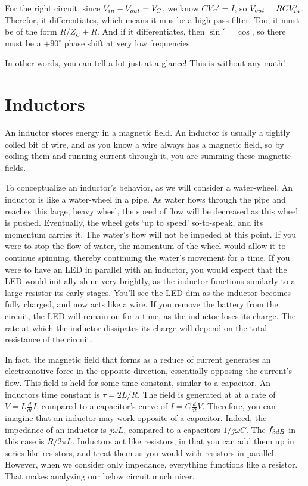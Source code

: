 For the right circuit, since ${V}_{in} - {V}_{out} = V_C$, we know $CV_C' = I$, so ${V}_{out} = RC{V}_{in}'$. Therefor, it differentiates, which means it mus be a high-pass filter. Too, it must be of the form $R/Z_C + R$. And if it differentiates, then $\sin ' = \cos$, so there must be a $+90^{\circ}$ phase shift at very low frequencies.\newline

In other words, you can tell a lot just at a glance! This is without any math!

\section{Inductors}
An inductor stores energy in a magnetic field. An inductor is usually a tightly coiled bit of wire, and as you know a wire always has a magnetic field, so by coiling them and running current through it, you are summing these magnetic fields.\newline

To conceptualize an inductor's behavior, as we will consider a water-wheel. An inductor is like a water-wheel in a pipe. As water flows through the pipe and reaches this large, heavy wheel, the speed of flow will be decreased as this wheel is pushed. Eventually, the wheel gets `up to speed' so-to-speak, and its momentum carries it. The water's flow will not be impeded at this point. If you were to stop the flow of water, the momentum of the wheel would allow it to continue spinning, thereby continuing the water's movement for a time. If you were to have an LED in parallel with an inductor, you would expect that the LED would initially shine very brightly, as the inductor functions similarly to a large resistor its early stages. You'll see the LED dim as the inductor becomes fully charged, and now acts like a wire. If you remove the battery from the circuit, the LED will remain on for a time, as the inductor loses its charge. The rate at which the inductor dissipates its charge will depend on the total resistance of the circuit.\newline

In fact, the magnetic field that forms as a reduce of current generates an electromotive force in the opposite direction, essentially opposing the current's flow. This field is held for some time constant, similar to a capacitor. An inductors time constant is $\tau = 2L/R$. The field is generated at at a rate of $V = L\frac{d}{dt}I$, compared to a capacitor's curve of $I = C\frac{d}{dt}V$. Therefore, you can imagine that an inductor may work opposite of a capacitor. Indeed, the impedance of an inductor is $j\omega L$, compared to a capacitors $1/ j\omega C$. The ${f}_{3dB}$ in this case is $R/2\pi L$. Inductors act like resistors, in that you can add them up in series like resistors, and treat them as you would with resistors in parallel. However, when we consider only impedance, everything functions like a resistor. That makes analyzing our below circuit much nicer. 

